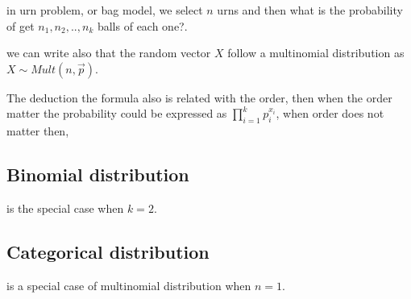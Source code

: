 \documentclass[10pt,a4paper]{article}
\begin{document}
in urn problem, or bag model, we select $n$ urns 
and then what is the probability of get $n_{1},n_{2},..,n_{k}$ balls of each one?.


we can write also that the random vector $X$ follow a multinomial distribution as  $X \sim Mult(n, \vec{p})$.

The deduction the formula also is related  with the order, then when the order matter the probability could be expressed as $\prod_{i=1}^{k}p_{i}^{x_{i}}$, when order does not matter then, 

\subsection{Binomial distribution}
is the special case when $k=2$.

\subsection{Categorical distribution}
is a special case of multinomial distribution when $n=1$.
\end{document}
